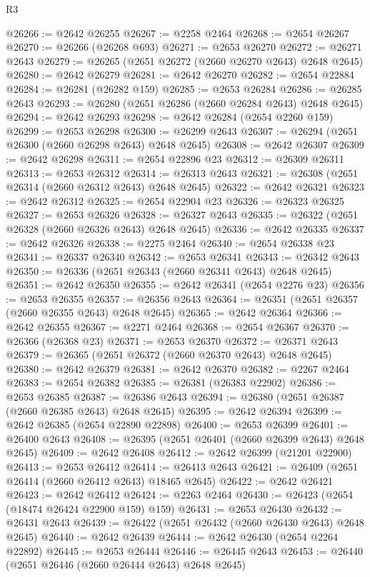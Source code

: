 \begin{lexlean}{R3}
\begin{coremodule}
@26266 := @2642 @26255
@26267 := @2258 @2464
@26268 := @2654 @26267
@26270 := @26266 (@26268 @693)
@26271 := @2653 @26270
@26272 := @26271 @2643
@26279 := @26265 (@2651 @26272 (@2660 @26270 @2643) @2648 @2645)
@26280 := @2642 @26279
@26281 := @2642 @26270
@26282 := @2654 @22884
@26284 := @26281 (@26282 @159)
@26285 := @2653 @26284
@26286 := @26285 @2643
@26293 := @26280 (@2651 @26286 (@2660 @26284 @2643) @2648 @2645)
@26294 := @2642 @26293
@26298 := @2642 @26284 (@2654 @2260 @159)
@26299 := @2653 @26298
@26300 := @26299 @2643
@26307 := @26294 (@2651 @26300 (@2660 @26298 @2643) @2648 @2645)
@26308 := @2642 @26307
@26309 := @2642 @26298
@26311 := @2654 @22896 @23
@26312 := @26309 @26311
@26313 := @2653 @26312
@26314 := @26313 @2643
@26321 := @26308 (@2651 @26314 (@2660 @26312 @2643) @2648 @2645)
@26322 := @2642 @26321
@26323 := @2642 @26312
@26325 := @2654 @22904 @23
@26326 := @26323 @26325
@26327 := @2653 @26326
@26328 := @26327 @2643
@26335 := @26322 (@2651 @26328 (@2660 @26326 @2643) @2648 @2645)
@26336 := @2642 @26335
@26337 := @2642 @26326
@26338 := @2275 @2464
@26340 := @2654 @26338 @23
@26341 := @26337 @26340
@26342 := @2653 @26341
@26343 := @26342 @2643
@26350 := @26336 (@2651 @26343 (@2660 @26341 @2643) @2648 @2645)
@26351 := @2642 @26350
@26355 := @2642 @26341 (@2654 @2276 @23)
@26356 := @2653 @26355
@26357 := @26356 @2643
@26364 := @26351 (@2651 @26357 (@2660 @26355 @2643) @2648 @2645)
@26365 := @2642 @26364
@26366 := @2642 @26355
@26367 := @2271 @2464
@26368 := @2654 @26367
@26370 := @26366 (@26368 @23)
@26371 := @2653 @26370
@26372 := @26371 @2643
@26379 := @26365 (@2651 @26372 (@2660 @26370 @2643) @2648 @2645)
@26380 := @2642 @26379
@26381 := @2642 @26370
@26382 := @2267 @2464
@26383 := @2654 @26382
@26385 := @26381 (@26383 @22902)
@26386 := @2653 @26385
@26387 := @26386 @2643
@26394 := @26380 (@2651 @26387 (@2660 @26385 @2643) @2648 @2645)
@26395 := @2642 @26394
@26399 := @2642 @26385 (@2654 @22890 @22898)
@26400 := @2653 @26399
@26401 := @26400 @2643
@26408 := @26395 (@2651 @26401 (@2660 @26399 @2643) @2648 @2645)
@26409 := @2642 @26408
@26412 := @2642 @26399 (@21201 @22900)
@26413 := @2653 @26412
@26414 := @26413 @2643
@26421 := @26409 (@2651 @26414 (@2660 @26412 @2643) @18465 @2645)
@26422 := @2642 @26421
@26423 := @2642 @26412
@26424 := @2263 @2464
@26430 := @26423 (@2654 (@18474 @26424 @22900 @159) @159)
@26431 := @2653 @26430
@26432 := @26431 @2643
@26439 := @26422 (@2651 @26432 (@2660 @26430 @2643) @2648 @2645)
@26440 := @2642 @26439
@26444 := @2642 @26430 (@2654 @2264 @22892)
@26445 := @2653 @26444
@26446 := @26445 @2643
@26453 := @26440 (@2651 @26446 (@2660 @26444 @2643) @2648 @2645)

\end{coremodule}
\end{lexlean}
